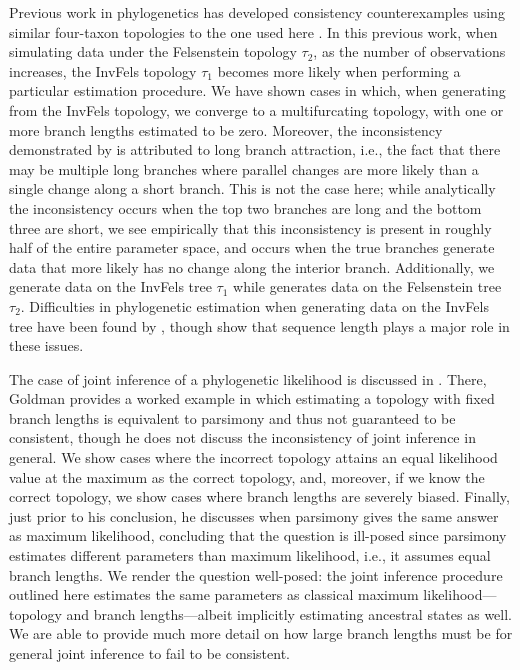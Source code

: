 \documentclass[11pt]{article}
\begin{document}
Previous work in phylogenetics has developed consistency counterexamples using similar four-taxon topologies to the one used here \citep{Felsenstein1978-rr}.
In this previous work, when simulating data under the Felsenstein topology $\tau_2$, as the number of observations increases, the InvFels topology $\tau_1$ becomes more likely when performing a particular estimation procedure.
We have shown cases in which, when generating from the InvFels topology, we converge to a multifurcating topology, with one or more branch lengths estimated to be zero.
Moreover, the inconsistency demonstrated by \citet{Felsenstein1978-rr} is attributed to long branch attraction, i.e., the fact that there may be multiple long branches where parallel changes are more likely than a single change along a short branch.
This is not the case here; while analytically the inconsistency occurs when the top two branches are long and the bottom three are short, we see empirically that this inconsistency is present in roughly half of the entire parameter space, and occurs when the true branches generate data that more likely has no change along the interior branch.
Additionally, we generate data on the InvFels tree $\tau_1$ while \citet{Felsenstein1978-rr} generates data on the Felsenstein tree $\tau_2$.
Difficulties in phylogenetic estimation when generating data on the InvFels tree have been found by \citet{Siddall1998-hq}, though \citet{Swofford2001-hr} show that sequence length plays a major role in these issues.

The case of joint inference of a phylogenetic likelihood is discussed in \citet{Goldman1990-dk}.
There, Goldman provides a worked example in which estimating a topology with fixed branch lengths is equivalent to parsimony and thus not guaranteed to be consistent, though he does not discuss the inconsistency of joint inference in general.
We show cases where the incorrect topology attains an equal likelihood value at the maximum as the correct topology, and, moreover, if we know the correct topology, we show cases where branch lengths are severely biased.
Finally, just prior to his conclusion, he discusses when parsimony gives the same answer as maximum likelihood, concluding that the question is ill-posed since parsimony estimates different parameters than maximum likelihood, i.e., it assumes equal branch lengths.
We render the question well-posed: the joint inference procedure outlined here estimates the same parameters as classical maximum likelihood---topology and branch lengths---albeit implicitly estimating ancestral states as well.
We are able to provide much more detail on how large branch lengths must be for general joint inference to fail to be consistent.
\end{document}
